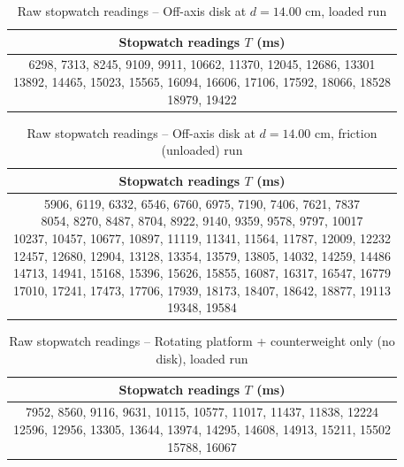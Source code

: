 \begin{table}[htb!]
\centering
\caption{Raw stopwatch readings -- Off-axis disk at $d = 14.00$ cm, loaded run}
\begin{tabular}{c}
\toprule
Stopwatch readings $T$ (\unit{\ms}) \\
\midrule
\makecell{6298, 7313, 8245, 9109, 9911, 10662, 11370, 12045, 12686, 13301 \\ 13892, 14465, 15023, 15565, 16094, 16606, 17106, 17592, 18066, 18528 \\ 18979, 19422} \\
\bottomrule
\end{tabular}
\end{table}
\begin{table}[htb!]
\centering
\caption{Raw stopwatch readings -- Off-axis disk at $d = 14.00$ cm, friction (unloaded) run}
\begin{tabular}{c}
\toprule
Stopwatch readings $T$ (\unit{\ms}) \\
\midrule
\makecell{5906, 6119, 6332, 6546, 6760, 6975, 7190, 7406, 7621, 7837 \\ 8054, 8270, 8487, 8704, 8922, 9140, 9359, 9578, 9797, 10017 \\ 10237, 10457, 10677, 10897, 11119, 11341, 11564, 11787, 12009, 12232 \\ 12457, 12680, 12904, 13128, 13354, 13579, 13805, 14032, 14259, 14486 \\ 14713, 14941, 15168, 15396, 15626, 15855, 16087, 16317, 16547, 16779 \\ 17010, 17241, 17473, 17706, 17939, 18173, 18407, 18642, 18877, 19113 \\ 19348, 19584} \\
\bottomrule
\end{tabular}
\end{table}
\begin{table}[htb!]
\centering
\caption{Raw stopwatch readings -- Rotating platform + counterweight only (no disk), loaded run}
\begin{tabular}{c}
\toprule
Stopwatch readings $T$ (\unit{\ms}) \\
\midrule
\makecell{7952, 8560, 9116, 9631, 10115, 10577, 11017, 11437, 11838, 12224 \\ 12596, 12956, 13305, 13644, 13974, 14295, 14608, 14913, 15211, 15502 \\ 15788, 16067} \\
\bottomrule
\end{tabular}
\end{table}
